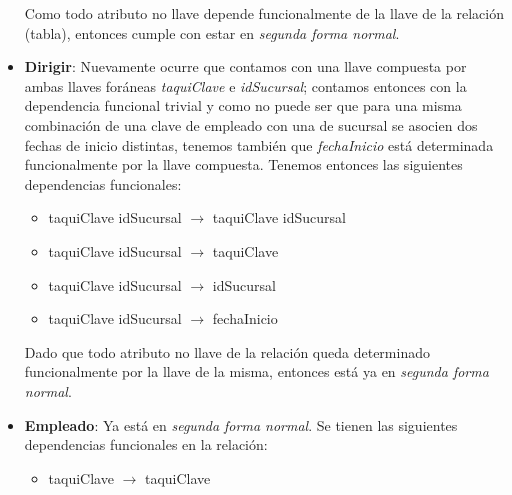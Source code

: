 \documentclass[11pt,letterpaper]{article}
\begin{document}
\begin{itemize}
Como todo atributo no llave depende funcionalmente de la llave de la relación (tabla), entonces cumple con estar en \textit{segunda forma normal}.
\item \textbf{Dirigir}: Nuevamente ocurre que contamos con una llave compuesta por ambas llaves foráneas \textit{taquiClave} e \textit{idSucursal}; contamos entonces con la dependencia funcional trivial y como no puede ser que para una misma combinación de una clave de empleado con una de sucursal se asocien dos fechas de inicio distintas, tenemos también que \textit{fechaInicio} está determinada funcionalmente por la llave compuesta. Tenemos entonces las siguientes dependencias funcionales:

\begin{itemize}
\item taquiClave idSucursal $\rightarrow$ taquiClave idSucursal

\item taquiClave idSucursal $\rightarrow$ taquiClave
\item taquiClave idSucursal $\rightarrow$ idSucursal
\item taquiClave idSucursal $\rightarrow$ fechaInicio
\end{itemize}

Dado que todo atributo no llave de la relación queda determinado funcionalmente por la llave de la misma, entonces está ya en \textit{segunda forma normal}.
\item \textbf{Empleado}: Ya está en \textit{segunda forma normal}. Se tienen las siguientes dependencias funcionales en la relación:

\begin{itemize}
\item taquiClave $\rightarrow$ taquiClave


\end{itemize}
\end{itemize}
\end{document}
